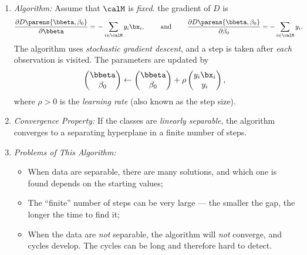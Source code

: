 \documentclass[12pt]{article}
\begin{document}
\begin{enumerate}[label=\textbf{\arabic*.}]
\begin{enumerate}
		\item \textit{Algorithm:} Assume that $\calM$ is \emph{fixed}. the gradient of $D$ is 
		\begin{align*}
			\frac{\partial D \parens{\bbeta, \beta_0}}{\partial \bbeta} = & \, - \sum_{i \in \calM} y_i \bx_i, \qquad \text{ and } \qquad
			\frac{\partial D \parens{\bbeta, \beta_0}}{\partial \beta_0} = - \sum_{i \in \calM} y_i. \nonumber
		\end{align*}
		The algorithm uses \textit{stochastic gradient descent}, and a step is taken after \emph{each} observation is visited. The parameters are updated by 
		\begin{equation*}
			\begin{pmatrix}
				\bbeta \\ \beta_0
			\end{pmatrix} \leftarrow 
			\begin{pmatrix}
			\bbeta \\ \beta_0
			\end{pmatrix} + \rho 
			\begin{pmatrix}
				y_i \bx_i \\ y_i
			\end{pmatrix}, 
		\end{equation*}
		where $\rho > 0$ is the \emph{learning rate} (also known as the step size). 
		
		\item \textit{Convergence Property:} If the classes are \textit{linearly separable}, the algorithm converges to a separating hyperplane in a finite number of steps. 
		
		\item \textit{Problems of This Algorithm:} 
		\begin{itemize}
			\item When data are separable, there are many solutions, and which one is found depends on the starting values; 
			\item The ``finite'' number of steps can be very large --- the smaller the gap, the longer the time to find it; 
			\item When the data are \textit{not} separable, the algorithm will \emph{not} converge, and cycles develop. The cycles can be long and therefore hard to detect. 
		\end{itemize}
		
	\end{enumerate}
	

\end{enumerate}
\end{document}

